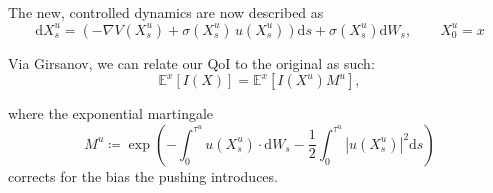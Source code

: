 \documentclass[
  a4paper,
  ignorenonframetext,
]{beamer}
\begin{document}
\begin{frame}
The new, controlled dynamics are now described as \begin{equation}
\label{eq: controlled langevin sde}
\mathrm dX_s^u = (-\nabla V(X_s^u) + \sigma(X_s^u)  \,  u(X_s^u))\mathrm ds + \sigma(X_s^u) \mathrm dW_s, \qquad X_0^u = x 
\end{equation}

\pause

Via Girsanov, we can relate our QoI to the original as such:
\begin{equation}
\label{eq: expectation IS}
    \mathbb{E}^x\left[I(X)\right] = \mathbb{E}^x\left[I(X^u) M^u\right],
\end{equation}

\pause

where the exponential martingale \begin{equation}
\label{eq: girsanov martingale}
M^u \coloneqq \exp{\left(-  \int_0^{\tau^u} u(X_s^u) \cdot \mathrm dW_s - \frac{1}{2} \int_0^{\tau^u} |u(X_s^u)|^2 \mathrm ds \right)}
\end{equation} corrects for the bias the pushing introduces.
\end{frame}
\end{document}
